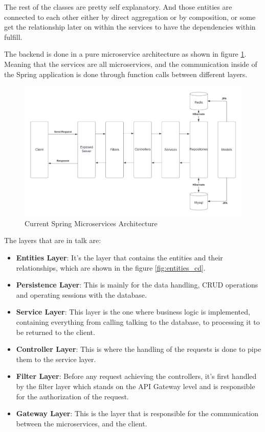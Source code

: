 The rest of the classes are pretty self explanatory. And those entities are 
connected to each other either by direct aggregation or by composition, or
some get the relationship later on within the services to have the dependencies
within fulfill.

The backend is done in a pure microservice architecture as shown in figure
\ref{fig:microservices_spring}. Meaning that the services are all microservices,
and the communication inside of the Spring application is done through function
calls between different layers.

\begin{figure}[!ht]
    \centering
    \includegraphics[width=1\textwidth]{images/Microservices Spring.png}
    \caption{\footnotesize{Current Spring Microservices Architecture}}
    \label{fig:microservices_spring}
\end{figure}

The layers that are in talk are:

    \begin{itemize}
        \item \textbf{Entities Layer}: 
            It's the layer that contains the entities and their relationships,
            which are shown in the figure \ref{fig:entities_cd}.
        \item \textbf{Persistence Layer}:
            This is mainly for the data handling, CRUD operations and operating
            sessions with the database.
        \item \textbf{Service Layer}:
            This layer is the one where business logic is implemented,
            containing everything from calling talking to the database,
            to processing it to be returned to the client.
        \item \textbf{Controller Layer}:
            This is where the handling of the requests is done to pipe them
            to the service layer.
        \item \textbf{Filter Layer}:
            Before any request achieving the controllers, it's first handled by
            the filter layer which stands on the API Gateway level and is
            responsible for the authorization of the request.
        \item \textbf{Gateway Layer}:
            This is the layer that is responsible for the communication between
            the microservices, and the client.
    \end{itemize}

